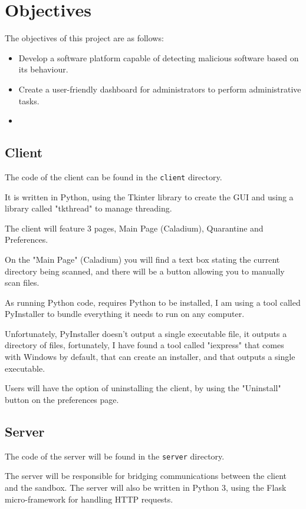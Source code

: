 \section{Objectives}
The objectives of this project are as follows:
\begin{itemize}
    \item Develop a software platform capable of detecting malicious software based on its behaviour.
    \item Create a user-friendly dashboard for administrators to perform administrative tasks.
    \item 
\end{itemize}

\subsection{Client}
The code of the client can be found in the \texttt{client} directory.

It is written in Python, using the Tkinter library to create the GUI and using a library called "tkthread" to manage threading.

The client will feature 3 pages, Main Page (Caladium), Quarantine and Preferences.

On the "Main Page" (Caladium) you will find a text box stating the current directory being scanned, and there will be a button allowing you to manually scan files.

As running Python code, requires Python to be installed,
I am using a tool called PyInstaller to bundle everything it needs to run on any computer.

Unfortunately, PyInstaller doesn't output a single executable file,
it outputs a directory of files, fortunately, I have found a tool called "iexpress" that comes with Windows by default, that can create an installer,
and that outputs a single executable.

Users will have the option of uninstalling the client, by using the "Uninstall" button on the preferences page.

\subsection{Server}
The code of the server will be found in the \texttt{server} directory.

The server will be responsible for bridging communications between the client and the sandbox.
The server will also be written in Python 3, using the Flask micro-framework for handling HTTP requests.


